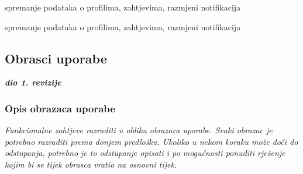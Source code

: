 \begin{packed_enum}
	\item  {}
	\begin{packed_enum}
		
		\item spremanje podataka o profilima, zahtjevima, razmjeni notifikacija
		
	\end{packed_enum}
	
	\item  {}
	\begin{packed_enum}
		
		\item spremanje podataka o profilima, zahtjevima, razmjeni notifikacija
		
	\end{packed_enum}
\end{packed_enum}

\eject 



\subsection{Obrasci uporabe}

\textbf{\textit{dio 1. revizije}}

\subsubsection{Opis obrazaca uporabe}
\textit{Funkcionalne zahtjeve razraditi u obliku obrazaca uporabe. Svaki obrazac je potrebno razraditi prema donjem predlošku. Ukoliko u nekom koraku može doći do odstupanja, potrebno je to odstupanje opisati i po mogućnosti ponuditi rješenje kojim bi se tijek obrasca vratio na osnovni tijek.}\\


